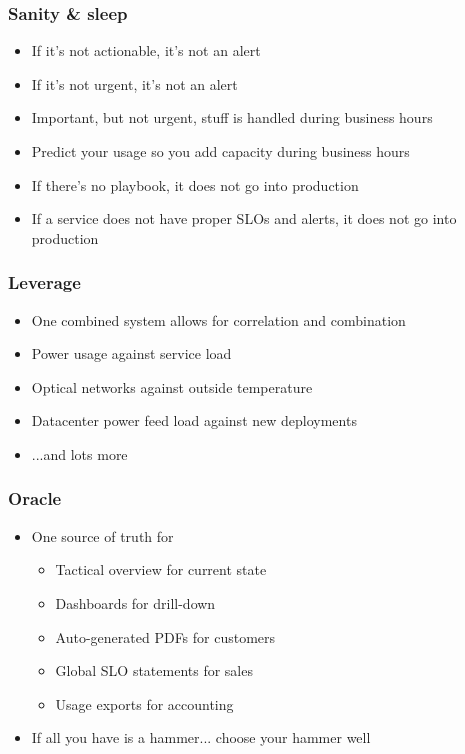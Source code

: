 \documentclass[t]{beamer}
\begin{document}
\begin{frame}
	\frametitle{Sanity \& sleep}
	\begin{itemize}
		\item If it's not actionable, it's not an alert
		\item If it's not urgent, it's not an alert
		\item Important, but not urgent, stuff is handled during business hours
		\item Predict your usage so you add capacity during business hours
		\item If there's no playbook, it does not go into production
		\item If a service does not have proper SLOs and alerts, it does not go into production
	\end{itemize}
\end{frame}
\begin{frame}
	\frametitle{Leverage}
	\begin{itemize}
		\item One combined system allows for correlation and combination
		\item Power usage against service load
		\item Optical networks against outside temperature
		\item Datacenter power feed load against new deployments
		\item ...and lots more
	\end{itemize}
\end{frame}

\begin{frame}
	\frametitle{Oracle}
	\begin{itemize}
		\item One source of truth for
		\begin{itemize}
			\item Tactical overview for current state
			\item Dashboards for drill-down
			\item Auto-generated PDFs for customers
			\item Global SLO statements for sales
			\item Usage exports for accounting
		\end{itemize}
	\item If all you have is a hammer... choose your hammer well
	\end{itemize}
\end{frame}
\end{document}
